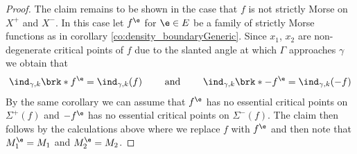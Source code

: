 \begin{proof}
  The claim remains to be shown in the case that $f$ is not strictly Morse on $X^+$ and $X^-$. In this case let
  $f^\e$ for $\e\in E$ be a family of strictly Morse functions as in corollary \ref{co:density_boundaryGeneric}.
  Since $x_1$, $x_2$ are non-degenerate critical points of $f$
  due to the slanted angle at which
  $\Gamma$ approaches $\gamma$
  we obtain that
  \begin{align}
    \ind_{\gamma,k}\brk*{f^\e}=\ind_{\gamma,k}(f)\qquad\text{ and }\qquad 
    \ind_{\gamma,k}\brk*{-f^\e}=\ind_{\gamma,k}(-f)
    \label{eq:n3_disproof_morse_indexApprox}
  \end{align}
  By the same corollary we can assume that $f^\e$ has no essential critical points on
  $\Sigma^+(f)$ and $-f^\e$ has no essential critical points on $\Sigma^-(f)$.
  The claim then follows by the calculations above where we replace
  $f$ with $f^\e$ and then note that $M_1^\e=M_1$ and $M_2^\e=M_2$.
\end{proof}


